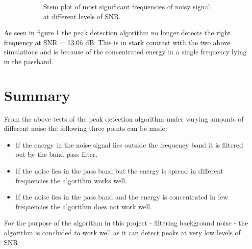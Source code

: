 \begin{figure}[H]
\begin{subfigure}{0.49\textwidth}
\caption{Stem plot of most significant frequencies of noisy signal at different levels of SNR.}
\label{fig:concentrated_stem}
\end{subfigure}
\caption{}
\label{fig:concentrated_noise}
\end{figure}

As seen in figure \ref{fig:concentrated_stem} the peak detection algorithm no longer detects the right frequency at SNR = 13.06 dB. This is in stark contrast with the two above simulations and is because of the concentrated energy in a single frequency lying in the passband.

\section{Summary}
From the above tests of the peak detection algorithm under varying amounts of different noise the following three points can be made:
\begin{itemize}
\item If the energy in the noise signal lies outside the frequency band it is filtered out by the band pass filter.
\item If the noise lies in the pass band but the energy is spread in different frequencies the algorithm works well.
\item If the noise lies in the pass band and the energy is concentrated in few frequencies the algorithm does not work well.
\end{itemize}
For the purpose of the algorithm in this project - filtering background noise - the algorithm is concluded to work well as it can detect peaks at very low levels of SNR.
